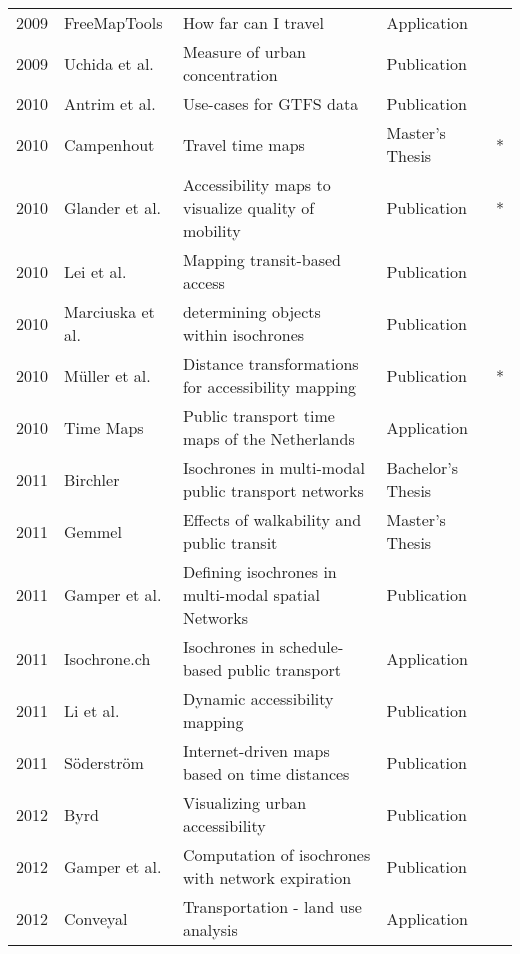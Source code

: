 \begin{table}[htb]
\begin{tabular}{r|l|l|l|c}
        2009 & FreeMapTools \cite{Freemaptools} & How far can I travel  & Application  & \\
        2009 & Uchida et al. \cite{uchida2009agglomeration} & Measure of urban concentration  & Publication  & \\
        2010 & Antrim et al. \cite{antrim2013many} & Use-cases for GTFS data & Publication  & \\
        2010 & Campenhout \cite{van2010travel} & Travel time maps  & Master's Thesis  & * \\
        2010 & Glander et al. \cite{Glander2010} & Accessibility maps to visualize quality of mobility  &  Publication & * \\
        2010 & Lei et al. \cite{lei2010mapping} & Mapping transit-based access  & Publication  & \\
        2010 & Marciuska et al. \cite{marciuska2010determining} & determining objects within isochrones  & Publication  & \\
        2010 & Müller et al. \cite{Mueller2010} & Distance transformations for accessibility mapping  &  Publication & * \\
        2010 & Time Maps \cite{TimeMaps} & Public transport time maps of the Netherlands & Application  & \\
        2011 & Birchler \cite{birchler2011computing} & Isochrones in multi-modal public transport networks  & Bachelor's Thesis  & \\
        2011 & Gemmel \cite{gemmel2012hedonic} &  Effects of walkability and public transit & Master's Thesis  & \\
        2011 & Gamper et al. \cite{gamper2011defining} & Defining isochrones in multi-modal spatial Networks & Publication  & \\
        2011 & Isochrone.ch \cite{IsochroneCh}  & Isochrones in schedule-based public transport  & Application  & \\
        2011 & Li et al. \cite{li2011dynamic} & Dynamic accessibility mapping  & Publication  & \\
        2011 & Söderström \cite{soderstrom2011personal} & Internet-driven maps based on time distances  & Publication  & \\
        2012 & Byrd \cite{Byrd2012} & Visualizing urban accessibility  & Publication  & \\
        2012 & Gamper et al. \cite{gamper2012scalable} & Computation of isochrones with network expiration  & Publication  & \\
        2012 & Conveyal \cite{Conveyal} & Transportation - land use analysis  & Application  & \\

\end{tabular}
\end{table}
